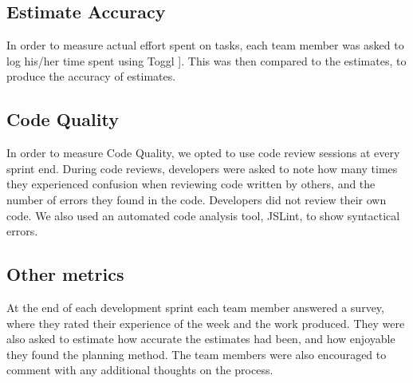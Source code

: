 \documentclass{sigchi}
\begin{document}
\subsection{Estimate Accuracy}
In order to measure actual effort spent on tasks, each team member was asked to log his/her time spent using Toggl \cite{Toggl}]. This was then compared to the estimates, to produce the accuracy of estimates.

\subsection{Code Quality}
In order to measure Code Quality, we opted to use code review sessions at every sprint end. During code reviews, developers were asked to note how many times they experienced confusion when reviewing code written by others, and the number of errors they found in the code. Developers did not review their own code.
We also used an automated code analysis tool, JSLint, to show syntactical errors.

\subsection{Other metrics}
At the end of each development sprint each team member answered a survey, where they rated their experience of the week and the work produced. They were also asked to estimate how accurate the estimates had been, and how enjoyable they found the planning method. The team members were also encouraged to comment with any additional thoughts on the process.



%
%
%
%
%
\balance





\end{document}
